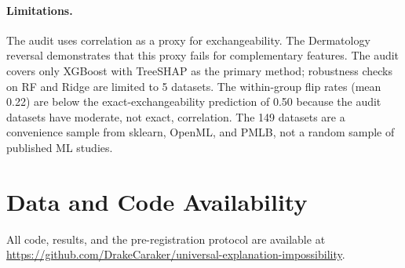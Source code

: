 \documentclass[11pt]{article}
\begin{document}
\paragraph{Limitations.}
The audit uses correlation as a proxy for exchangeability.  The
Dermatology reversal demonstrates that this proxy fails for complementary
features.  The audit covers only XGBoost with TreeSHAP as the primary
method; robustness checks on RF and Ridge are limited to 5 datasets.
The within-group flip rates (mean 0.22) are below the exact-exchangeability
prediction of 0.50 because the audit datasets have moderate, not exact,
correlation.  The 149 datasets are a convenience sample from sklearn,
OpenML, and PMLB, not a random sample of published ML studies.

\section*{Data and Code Availability}

All code, results, and the pre-registration protocol are available at
\url{https://github.com/DrakeCaraker/universal-explanation-impossibility}.



\end{document}
